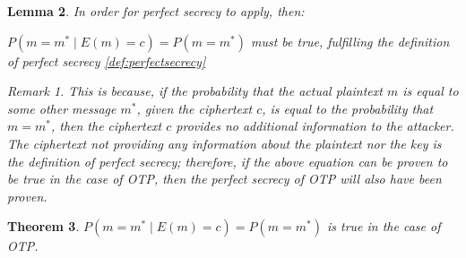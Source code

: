 \documentclass[12pt]{report}
\newtheorem{thm}{Theorem}[section]
\newtheorem{lemma}[thm]{Lemma}
\theoremstyle{definition}
\theoremstyle{remark}
\newtheorem{rem}[thm]{Remark}
\begin{document}
\begin{lemma}
In order for perfect secrecy to apply, then:

$P( m=m^{*} \mid E(m)=c ) = P( m=m^{*} )$
must be true, fulfilling the definition of perfect secrecy \ref{def:perfectsecrecy}

\begin{rem}
This is because, if the probability that the actual plaintext $m$ is equal to some other message $m^{*}$, given the ciphertext $c$, is equal to the probability that $m=m^{*}$, then the ciphertext $c$ provides no additional information to the attacker. The ciphertext not providing any information about the plaintext nor the key is the definition of perfect secrecy; therefore, if the above equation can be proven to be true in the case of OTP, then the perfect secrecy of OTP will also have been proven.
\end{rem}
\end{lemma}

\begin{thm}
$P( m=m^{*} \mid E(m)=c ) = P( m=m^{*} )$ is true in the case of OTP.
\end{thm}
\end{document}
